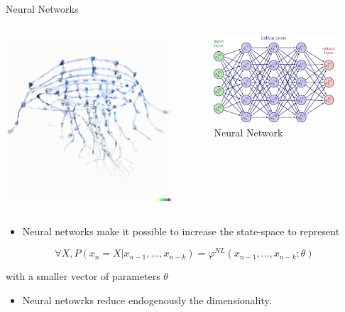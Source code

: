 \documentclass[
  ignorenonframetext,
]{beamer}
\providecommand{\tightlist}{%
  \setlength{\itemsep}{0pt}\setlength{\parskip}{0pt}}\usepackage{longtable,booktabs,array}
\begin{document}
\begin{frame}{Neural Networks}
\label{neural-networks}
\begin{columns}[T]
\begin{column}{0.48\linewidth}
\includegraphics[width=0.6\linewidth,height=\textheight,keepaspectratio]{assets/glowing_nn.png}
\end{column}

\begin{column}{0.48\linewidth}
\begin{figure}[H]

{\centering \includegraphics[width=0.6\linewidth,height=\textheight,keepaspectratio]{assets/neural_networks.png}

}

\caption{Neural Network}

\end{figure}%
\end{column}
\end{columns}

\begin{itemize}
\tightlist
\item
  Neural networks make it possible to increase the state-space to
  represent
\end{itemize}

\[\forall X, P(x_n=X| x_{n-1}, ..., x_{n-k}) = \varphi^{NL}( x_{n-1}, ..., x_{n-k}; \theta )\]

with a smaller vector of parameters \(\theta\)

\begin{itemize}
\tightlist
\item
  Neural netowrks reduce endogenously the dimensionality.
\end{itemize}
\end{frame}
\end{document}
